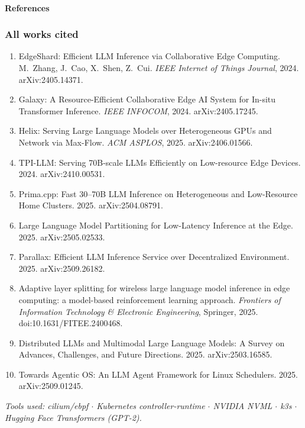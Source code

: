 \documentclass[aspectratio=169,11pt]{beamer}
\newcommand{\kefoot}[1]{%
  \vfill{\scriptsize\itshape\color{kemuted}#1}%
}
\begin{document}
\begin{frame}[shrink=20]
  \framesubtitle{References}
  \frametitle{All works cited}
  \scriptsize
  \begin{enumerate}\itemsep0.25em
    \item EdgeShard: Efficient LLM Inference via Collaborative Edge Computing.
      M.~Zhang, J.~Cao, X.~Shen, Z.~Cui. \emph{IEEE Internet of Things Journal},
      2024. arXiv:2405.14371.
    \item Galaxy: A Resource-Efficient Collaborative Edge AI System for In-situ
      Transformer Inference. \emph{IEEE INFOCOM}, 2024. arXiv:2405.17245.
    \item Helix: Serving Large Language Models over Heterogeneous GPUs and
      Network via Max-Flow. \emph{ACM ASPLOS}, 2025. arXiv:2406.01566.
    \item TPI-LLM: Serving 70B-scale LLMs Efficiently on Low-resource Edge
      Devices. 2024. arXiv:2410.00531.
    \item Prima.cpp: Fast 30--70B LLM Inference on Heterogeneous and
      Low-Resource Home Clusters. 2025. arXiv:2504.08791.
    \item Large Language Model Partitioning for Low-Latency Inference at the
      Edge. 2025. arXiv:2505.02533.
    \item Parallax: Efficient LLM Inference Service over Decentralized
      Environment. 2025. arXiv:2509.26182.
    \item Adaptive layer splitting for wireless large language model inference
      in edge computing: a model-based reinforcement learning approach.
      \emph{Frontiers of Information Technology \& Electronic Engineering},
      Springer, 2025. doi:10.1631/FITEE.2400468.
    \item Distributed LLMs and Multimodal Large Language Models: A Survey on
      Advances, Challenges, and Future Directions. 2025. arXiv:2503.16585.
    \item Towards Agentic OS: An LLM Agent Framework for Linux Schedulers.
      2025. arXiv:2509.01245.
  \end{enumerate}
  \kefoot{Tools used: cilium/ebpf $\cdot$ Kubernetes controller-runtime
          $\cdot$ NVIDIA NVML $\cdot$ k3s $\cdot$ Hugging Face Transformers
          (GPT-2).}
\end{frame}
\end{document}
